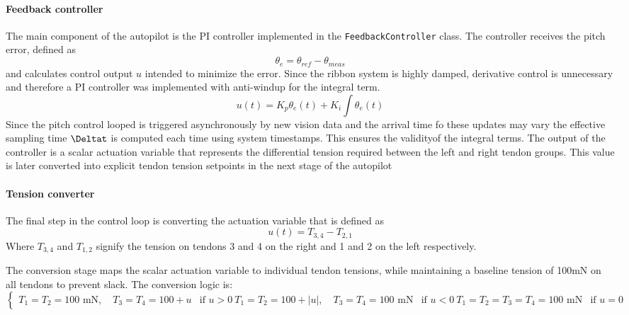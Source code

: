 \paragraph*{Feedback controller}
The main component of the autopilot is the PI controller implemented in the \texttt{FeedbackController} class. The controller receives the pitch error, defined as 
\begin{equation}
    \theta_e = \theta_{ref} - \theta_{meas}
\end{equation}
and calculates control output \(u\) intended to minimize the error. Since the ribbon system is highly damped, derivative control is unnecessary and therefore a PI controller was implemented with anti-windup for the integral term.
\begin{equation}
    u(t) = K_p \theta_e(t) + K_i \int \theta_e(t)
\end{equation}
Since the pitch control looped is triggered asynchronously by new vision data and the arrival time fo these updates may vary the effective sampling time \(\Deltat\) is computed each time using system timestamps. This ensures the validityof the integral terms.
\newline \newline
The output of the controller is a scalar actuation variable that represents the differential tension required between the left and right tendon groups. This value is later converted into explicit tendon tension setpoints in the next stage of the autopilot


\paragraph*{Tension converter}
The final step in the control loop is converting the actuation variable that is defined as 
\begin{equation}
    u(t) = T_{3, 4} - T_{2,1}
\end{equation}
Where \(T_{3, 4}\) and \(T_{1, 2}\) signify the tension on tendons 3 and 4 on the right and 1 and 2 on the left respectively.

The conversion stage maps the scalar actuation variable to individual tendon tensions, while maintaining a baseline tension of 100mN on all tendons to prevent slack. The conversion logic is:
\begin{equation}
\begin{cases}
T_1 = T_2 = 100 \text{ mN}, \quad T_3 = T_4 = 100 + u & \text{if } u > 0 \
T_1 = T_2 = 100 + |u|, \quad T_3 = T_4 = 100 \text{ mN} & \text{if } u < 0 \
T_1 = T_2 = T_3 = T_4 = 100 \text{ mN} & \text{if } u = 0
\end{cases}
\end{equation}



